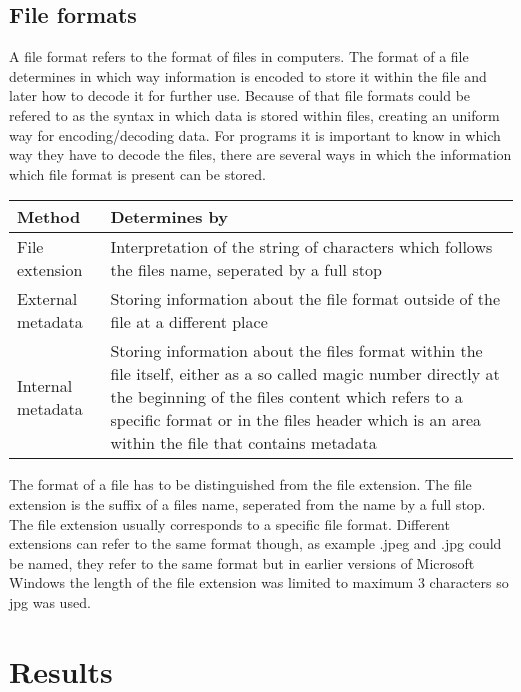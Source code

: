 \documentclass[a4paper,10pt]{article}
\begin{document}
\subsection{File formats}
A file format refers to the format of files in computers. The format of a file determines in which way information is encoded to store it within the file and later how to decode it for further use. Because of that file formats could be refered to as the syntax in which data is stored within files, creating an uniform way for encoding/decoding data. For programs it is important to know in which way they have to decode the files, there are several ways in which the information which file format is present can be stored.

\begin{center}

\begin{tabularx}{\textwidth}{l|X}
Method & Determines by\\
\hline
File extension & Interpretation of the string of characters which follows the files name, seperated by a full stop\\
\hline
External metadata & Storing information about the file format outside of the file at a different place\\
\hline
Internal metadata & Storing information about the files format within the file itself, either as a so called magic number directly at the beginning of the files content which refers to a specific format or in the files header which is an area within the file that contains metadata\\
\end{tabularx}

\end{center}

The format of a file has to be distinguished from the file extension. The file extension is the suffix of a files name, seperated from the name by a full stop. The file extension usually corresponds to a specific file format. Different extensions can refer to the same format though, as example .jpeg and .jpg could be named, they refer to the same format but in earlier versions of Microsoft Windows the length of the file extension was limited to maximum 3 characters so jpg was used.





\section{Results}
\end{document}
